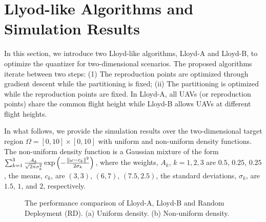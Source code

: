 \documentclass[12pt,onecolumn,journal,draftclsnofoot,letterpaper]{IEEEtran}
\begin{document}
\section{Llyod-like Algorithms and Simulation Results}
%
In this section, we introduce two Lloyd-like algorithms, Lloyd-A and Lloyd-B, to optimize the quantizer for
two-dimensional scenarios. The proposed
algorithms iterate between two steps: (1) The reproduction points are optimized through gradient descent while the
partitioning is fixed; (ii) The partitioning is optimized while the reproduction points are fixed.  In Lloyd-A, all UAVs
(or reproduction points) share the common flight height while Lloyd-B allows UAVs at different flight heights.

In what follows, we provide the simulation results over the two-dimensional target region $\Omega=[0,10]\times[0,10]$ with
uniform and non-uniform density functions.  The non-uniform density function is a Gaussian mixture of the form
$\sum_{k=1}^{3}\frac{A_k}{\sqrt{2\pi}\sigma^2_k}\exp{\left(-\frac{\|\ensuremath{\omega}-c_k\|^2}{2\sigma_k}\right)}$, where the
weights, $A_k$, $k=1,2,3$ are $0.5$, $0.25$, $0.25$, the means, $c_k$, are $(3,3)$, $(6,7)$, $(7.5,2.5)$, the standard deviations,
$\sigma_k$, are  $1.5$, $1$, and $2$, respectively.


\begin{figure}[!htb]
\setlength\abovecaptionskip{0pt}
\setlength\belowcaptionskip{0pt}
\centering
{}
\hfil
{}
\captionsetup{justification=justified}
\caption{\small{The performance comparison of Lloyd-A, Lloyd-B and Random Deployment (RD). 
(a) Uniform density. (b) Non-uniform density.}}
\label{Distortion}
\end{figure}
\end{document}
